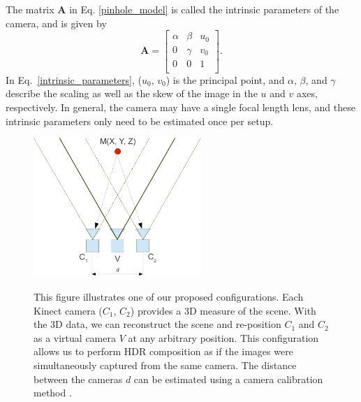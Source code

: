 The matrix $\mathbf{A}$ in Eq. \ref{pinhole_model} is called the intrinsic parameters of the camera, and is given by 
\begin{equation}
\mathbf{A} = 
\begin{bmatrix} 
  \alpha & \beta & u_{0}\\ 
  0 & \gamma & v_{0} \\
  0 & 0 & 1 \\  
\end{bmatrix}.
\label{intrinsic_parameters}
\end{equation} 
In Eq.~\ref{intrinsic_parameters}, ($u_{0}$, $v_{0}$) is the principal point, and $\alpha$, $\beta$, and $\gamma$ describe the scaling as well as the skew of the image in the $u$ and $v$ axes, respectively. In general, the camera may have a single focal length lens, and these intrinsic parameters only need to be estimated once per setup.
\begin{figure}
\centering
\includegraphics[width=2.5in]{ch4/diagrams/multi_virt_cam2.pdf} \\
\caption{This figure illustrates one of our proposed configurations. Each Kinect camera ($C_1$, $C_2$) provides a 3D measure of the scene. With the 3D data, we can reconstruct the scene and re-position $C_1$ and $C_2$ as a virtual camera $V$ at any arbitrary position. This configuration allows us to perform HDR composition as if the images were simultaneously captured from the same camera. The distance between the cameras $d$ can be estimated using a camera calibration method \cite{lo2013three}.}
\label{fig_v_camera}
\end{figure}
